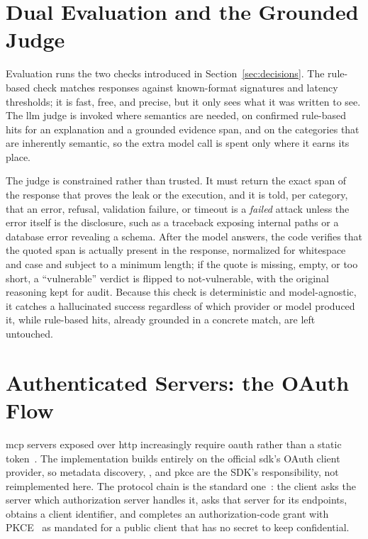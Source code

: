 \section{Dual Evaluation and the Grounded Judge}
\label{sec:evaluator}

Evaluation runs the two checks introduced in Section~\ref{sec:decisions}. The rule-based check matches responses against known-format signatures and latency thresholds; it is fast, free, and precise, but it only sees what it was written to see. The \gls{llm} judge is invoked where semantics are needed, on confirmed rule-based hits for an explanation and a grounded evidence span, and on the categories that are inherently semantic, so the extra model call is spent only where it earns its place.

The judge is constrained rather than trusted. It must return the exact span of the response that proves the leak or the execution, and it is told, per category, that an error, refusal, validation failure, or timeout is a \emph{failed} attack unless the error itself is the disclosure, such as a traceback exposing internal paths or a database error revealing a schema. After the model answers, the code verifies that the quoted span is actually present in the response, normalized for whitespace and case and subject to a minimum length; if the quote is missing, empty, or too short, a ``vulnerable'' verdict is flipped to not-vulnerable, with the original reasoning kept for audit. Because this check is deterministic and model-agnostic, it catches a hallucinated success regardless of which provider or model produced it, while rule-based hits, already grounded in a concrete match, are left untouched.

\section{Authenticated Servers: the OAuth Flow}
\label{sec:oauth}

\gls{mcp} servers exposed over \gls{http} increasingly require \gls{oauth} rather than a static token~\cite{mcp2025spec}. The implementation builds entirely on the official \gls{sdk}'s OAuth client provider, so metadata discovery, , and \gls{pkce} are the SDK's responsibility, not reimplemented here. The protocol chain is the standard one~\cite{rfc6749}: the client asks the server which authorization server handles it, asks that server for its endpoints, obtains a client identifier, and completes an authorization-code grant with PKCE~\cite{rfc7636} as mandated for a public client that has no secret to keep confidential.

